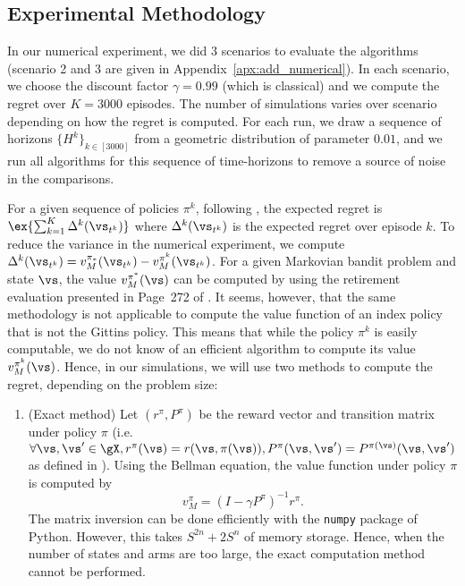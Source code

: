 \begin{subappendices}
\subsection{Experimental Methodology}
\label{ssec:experimental_methodo}

In our numerical experiment, we did 3 scenarios to evaluate the algorithms (scenario 2 and 3 are given in Appendix~\ref{apx:add_numerical}). In each scenario, we choose the discount factor $\gamma=0.99$ (which is classical) and we compute the regret over $K=3000$ episodes. The number of simulations varies over scenario depending on how the regret is computed. For each run, we draw a sequence of horizons $\{H^k\}_{k\in[3000]}$ from a geometric distribution of parameter $0.01$, and we run all algorithms for this sequence of time-horizons to remove a source of noise in the comparisons.  

For a given sequence of policies $\pi^k$, following , the expected regret is $\ex{\sum_{k=1}^K\Delta^k(\vs_{t^k})}$ where $\Delta^k(\vs_{t^k})$ is the expected regret over episode $k$.
To reduce the variance in the numerical experiment, we compute
$\Delta^k(\vs_{t^k})=v^{\pi_*}_M(\vs_{t^k}) -v^{\pi^k}_M(\vs_{t^k})$.
For a given Markovian bandit problem and state $\vs$, the value $v^{\pi^*}_{M}(\vs)$ can be computed by using the retirement evaluation presented in Page~272 of \cite{whittle1996optimal}. It seems, however, that the same methodology is not applicable to compute the value function of an index policy that is not the Gittins policy. This means that while the policy $\pi^k$ is easily computable, we do not know of an efficient algorithm to compute its value $v^{\pi^k}_{M}(\vs)$. Hence, in our simulations, we will use two methods to compute the regret, depending on the problem size:
\begin{enumerate}
    \item (Exact method) Let $(r^{\pi}, P^{\pi})$ be the reward vector and transition matrix under policy $\pi$ (i.e. $\forall \vs, \vs'\in\gX, r^{\pi}(\vs)=r(\vs,\pi(\vs)), P^{\pi}(\vs,\vs')=P^{\pi(\vs)}(\vs, \vs')$ as defined in ). Using the Bellman equation, the value function under policy $\pi$ is computed by
    \begin{equation}
        \label{eq:exact_value}
        v_{M}^{\pi}=(I-\gamma P^{\pi})^{-1}r^{\pi}.
    \end{equation}
    The matrix inversion can be done efficiently with the \texttt{numpy} package of Python. However, this takes $S^{2n}+2S^{n}$ of memory storage. Hence, when the number of states and arms are too large, the exact computation method cannot be performed. 


\end{enumerate}
\end{subappendices}
